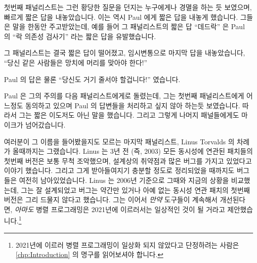 \fi

첫번째 패널리스트는 그런 황당한 질문을 던지는 누구에게나 경멸을 하는 듯
보였으며, 빠르게 짧은 답을 내놓았습니다.
이는 역시 Paul 에게 짧은 답을 내놓게 했습니다.
그들은 말을 한동안 주고받았는데, 예를 들어 그 패널리스트의 짧은 답 ``데드락''
은 Paul 의 ``락 의존성 검사기'' 라는 짧은 답을 유발했습니다.

그 패널리스트는 결국 짧은 답이 떨어졌고, 임시변통으로 마지막 답을 내놓았습니다,
``당신 같은 사람들은 망치에 머리를 맞아야 한다!''

Paul 의 답은 물론 ``당신도 거기 줄서야 할겁니다!'' 였습니다.

Paul 은 그의 주의를 다음 패널리스트에게로 돌렸는데, 그는 첫번째 패널리스트에게
어느정도 동의하고 있으며 Paul 의 답변들을 처리하고 싶지 않아 하는듯 보였습니다.
따라서 그는 짧은 이도저도 아닌 말을 했습니다.
그리고 그렇게 나머지 패널들에게도 마이크가 넘어갔습니다.

여러분이 그 이름을 들어봤을지도 모르는 마지막 패널리스트, Linus Torvalds 의
차례가 올때까지는 그랬습니다.
Linus 는 3년 전 (즉, 2003) 모든 동시성에 연관된 패치들의 첫번째 버전은 보통
무척 조악했으며, 설계상의 취약점과 많은 버그를 가지고 있었다고 이야기 했습니다.
그리고 그게 받아들여지기 충분할 정도로 정리되었을 때까지도 버그들은 여전히
남아있었습니다.
Linus 는 2006년 기준으로 그때와 지금의 상황을 비교했는데, 그는 잘 설계되었고
버그는 약간만 있거나 아예 없는 동시성 연관 패치의 첫번째 버전은 그리 드물지
않다고 했습니다.
그는 이어서 \emph{만약} 도구들이 계속해서 개선된다면, \emph{아마도} 병렬
프로그래밍은 2021년에 이르러서는 일상적인 것이 될 거라고
제안했습니다.\footnote{
	2021년에 이르러 병렬 프로그래밍이 일상화 되지 않았다고 단정하려는
	사람은 \cref{chp:Introduction} 의 명구를 읽어보셔야 합니다.}

